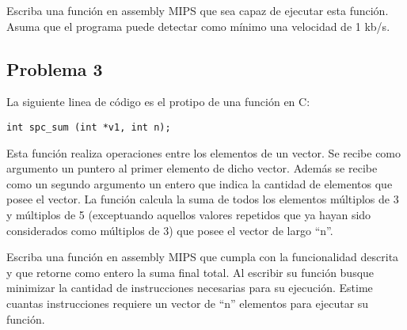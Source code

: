\documentclass[letterpaper,11pt,notitlepage]{article}
\begin{document}
Escriba una función en assembly MIPS que sea capaz de ejecutar esta función. Asuma que el programa puede detectar como mínimo una velocidad de 1 kb/s.

%
%          
%          
%          

\subsection*{Problema 3}

La siguiente linea de código es el protipo de una función en C:
\begin{lstlisting}[style=C]
  int spc_sum (int *v1, int n);
\end{lstlisting}
Esta función realiza operaciones entre los elementos de un vector. Se recibe como argumento un puntero al primer elemento de dicho vector. Además se recibe como un segundo argumento un entero que indica la cantidad de elementos que posee el vector. La función calcula la suma de todos los elementos múltiplos de 3 y múltiplos de 5 (exceptuando aquellos valores repetidos que ya hayan sido considerados como múltiplos de 3) que posee el vector de largo ``n''. 

Escriba una función en assembly MIPS que cumpla con la funcionalidad descrita y que retorne como entero la suma final total. Al escribir su función busque minimizar la cantidad de instrucciones necesarias para su ejecución. Estime cuantas instrucciones requiere un vector de ``n'' elementos para ejecutar su función.
\end{document}
